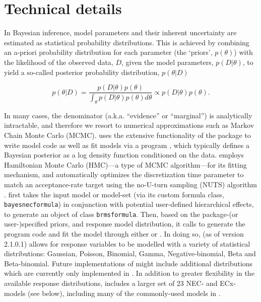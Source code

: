 \documentclass[
  shortnames]{jss}
\begin{document}
\hypertarget{technical-details}{%
\section{Technical details}\label{technical-details}}

In Bayesian inference, model parameters and their inherent uncertainty are estimated as statistical probability distributions. This is achieved by combining an a-priori probability distribution for each parameter (the `priors', \(p(\theta)\)) with the likelihood of the observed data, \(D\), given the model parameters, \(p(D | \theta)\), to yield a so-called posterior probability distribution, \(p(\theta | D)\)

\begin{equation}
  p(\theta | D) = \frac{p(D | \theta) p(\theta)}{\int_{\theta} p(D | \theta) p(\theta) d \theta} \propto p(D | \theta) p(\theta).
  \label{eqn1}
\end{equation}

In many cases, the denominator (a.k.a. ``evidence'' or ``marginal'') is analytically intractable, and therefore we resort to numerical approximations such as Markov Chain Monte Carlo (MCMC).  uses the extensive functionality of the  package to write model code as well as fit models via a  program \citep{stan2021}, which typically defines a Bayesian posterior as a log density function conditioned on the data.  employs Hamiltonian Monte Carlo (HMC)---a type of MCMC algorithm---for its fitting mechanism, and automatically optimizes the discretization time parameter to match an acceptance-rate target using the no-U-turn sampling (NUTS) algorithm \citep{hoffman2014}.  first takes the input model or model-set (via its custom formula class, \texttt{bayesnecformula}) in conjunction with potential user-defined hierarchical effects, to generate an object of class \texttt{brmsformula}. Then, based on the package-(or user-)specified priors, and response model distribution, it calls  \citep{Burkner2017, Burkner2018} to generate the  program code and fit the model through either  \citep{rstan2021} or \citep{cmdstanr2022}. In doing so,  (as of version 2.1.0.1) allows for response variables to be modelled with a variety of statistical distributions: Gaussian, Poisson, Binomial, Gamma, Negative-binomial, Beta and Beta-binomial. Future implementations of  might include additional distributions which are currently only implemented in . In addition to greater flexibility in the available response distributions,  includes a larger set of 23 NEC- and ECx- models (see below), including many of the commonly-used models in  \citep{Ritz2016}.
\end{document}
